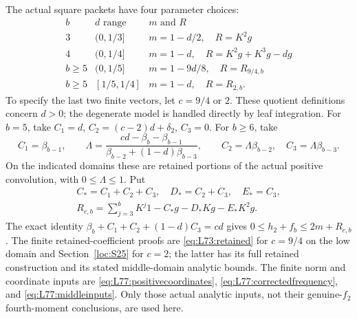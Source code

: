 The actual square packets have four parameter choices:
\[
\begin{array}{c|c|c}
 b&d\text{ range}&m\text{ and }R\\\hline
 3&(0,1/3]&m=1-d/2,\quad R=K^2g\\
 4&(0,1/4]&m=1-d,\quad R=K^2g+K^3g-dg\\
 b\ge5&(0,1/5]&m=1-9d/8,\quad R=R_{9/4,b}\\
 b\ge5&[1/5,1/4]&m=1-d,\quad R=R_{2,b}.
\end{array}
\]
To specify the last two finite vectors, let \(c=9/4\) or \(2\).
These quotient definitions concern \(d>0\); the degenerate model is
handled directly by leaf integration.
For \(b=5\), take \(C_1=d\), \(C_2=(c-2)d+\delta_2\),
\(C_3=0\). For \(b\ge6\), take
\[
 C_1=\beta_{b-1},\qquad
 \Lambda=\frac{cd-\beta_b-\beta_{b-1}}
 {\beta_{b-2}+(1-d)\beta_{b-3}},\qquad
 C_2=\Lambda\beta_{b-2},\quad C_3=\Lambda\beta_{b-3}.
\]
On the indicated domains these are retained portions of the actual
positive convolution, with \(0\le\Lambda\le1\). Put
\[
 \begin{gathered}
 C_*=C_1+C_2+C_3,\quad D_*=C_2+C_3,\quad E_*=C_3,\\
 R_{c,b}=\sum_{j=3}^bK^j1-C_*g-D_*Kg-E_*K^2g.
 \end{gathered}
\]
The exact identity
\(\beta_b+C_1+C_2+(1-d)C_3=cd\) gives
\(0\le h_2+f_b\le2m+R_{c,b}\). The finite retained-coefficient
proofs are \eqref{eq:L73:retained} for \(c=9/4\) on the low domain
and Section~\ref{loc:S25} for \(c=2\); the latter has its full
retained construction and its stated middle-domain analytic bounds.
The finite norm and coordinate inputs are
\eqref{eq:L77:positivecoordinates},
\eqref{eq:L77:correctedfrequency}, and
\eqref{eq:L77:middleinputs}. Only those actual analytic inputs,
not their genuine-\(f_2\) fourth-moment conclusions, are used here.


